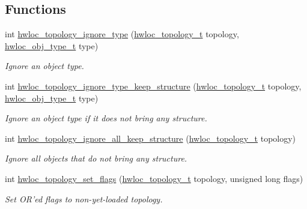 \subsection*{Functions}
\begin{CompactItemize}
\item 
int \hyperlink{group__hwlocality__configuration_gfcf30842e8cb47b4c3dcaebecea31e17}{hwloc\_\-topology\_\-ignore\_\-type} (\hyperlink{group__hwlocality__topology_g9d1e76ee15a7dee158b786c30b6a6e38}{hwloc\_\-topology\_\-t} topology, \hyperlink{group__hwlocality__types_gcd37bb612667dc437d66bfb175a8dc55}{hwloc\_\-obj\_\-type\_\-t} type)
\begin{CompactList}\small\item\em Ignore an object type. \item\end{CompactList}\item 
int \hyperlink{group__hwlocality__configuration_g1f987bca941d6949faf7b1554dd7bc12}{hwloc\_\-topology\_\-ignore\_\-type\_\-keep\_\-structure} (\hyperlink{group__hwlocality__topology_g9d1e76ee15a7dee158b786c30b6a6e38}{hwloc\_\-topology\_\-t} topology, \hyperlink{group__hwlocality__types_gcd37bb612667dc437d66bfb175a8dc55}{hwloc\_\-obj\_\-type\_\-t} type)
\begin{CompactList}\small\item\em Ignore an object type if it does not bring any structure. \item\end{CompactList}\item 
int \hyperlink{group__hwlocality__configuration_g7c9cf147442d65d755c664ccde3bb3ef}{hwloc\_\-topology\_\-ignore\_\-all\_\-keep\_\-structure} (\hyperlink{group__hwlocality__topology_g9d1e76ee15a7dee158b786c30b6a6e38}{hwloc\_\-topology\_\-t} topology)
\begin{CompactList}\small\item\em Ignore all objects that do not bring any structure. \item\end{CompactList}\item 
int \hyperlink{group__hwlocality__configuration_gaeed4df656979e5f16befea9d29b814b}{hwloc\_\-topology\_\-set\_\-flags} (\hyperlink{group__hwlocality__topology_g9d1e76ee15a7dee158b786c30b6a6e38}{hwloc\_\-topology\_\-t} topology, unsigned long flags)
\begin{CompactList}\small\item\em Set OR'ed flags to non-yet-loaded topology. \item\end{CompactList}\item 

\end{CompactItemize}
